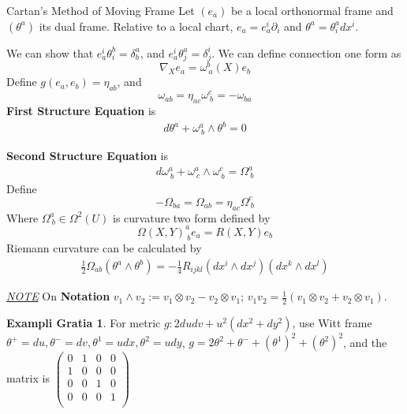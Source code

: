 \documentclass[twocolumn]{article}
\renewcommand{\emph}[1]{{\color{blue!70!black}\sffamily\bfseries #1}}
\newcommand{\n}{\nabla}
\newcommand{\p}{\partial}
\newcommand{\N}{\textit{\underline{NOTE} }}
\newcommand{\W}{\Omega}
\theoremstyle{definition}
\newtheorem{example}[thm]{Exampli Gratia}
\begin{document}
\begin{fthm}{Cartan's Method of Moving Frame}{}
	Let $(e_a)$ be a local orthonormal frame and $(\theta ^a)$ its dual frame.
	Relative to a local chart, $e_a = e^i_a \p_i$ and $\theta^a = \theta^a_i dx^i$.

	We can show that $e^i_a \theta^b_i = \delta^a_b$, and $e^i_a \theta^a_j = \delta^i_j$.
	We can define connection one form as 
	$$
	\n_X e_a= \omega^b_{\ a}(X) e_b
	$$
	Define $g(e_a, e_b) = \eta_{ab}$, and 
	$$
	\omega_{ab} = \eta_{ac} \omega^c_{\ b} = - \omega_{ba}
	$$
	\emph{First Structure Equation} is
	\begin{align}
		d \theta^a + \omega^a_{\ b} \wedge \theta^b = 0
	\end{align}

	\emph{Second Structure Equation} is
	\begin{align}
		d \omega^a_{\ b} + \omega^a_{\ c} \wedge \omega^c_{\ b} = \Omega^a_{\ b}
	\end{align}
	Define 
	$$
		- \W_{ba} = \W_{ab} = \eta_{ac}\W^c_{\ b} 
	$$
	Where $\W^a_{\ b} \in \W^2(U)$ is curvature two form defined by 
	$$
		\W(X,Y)^a_{\ b} e_a = R(X, Y) e_b
	$$
	Riemann curvature can be calculated by 
	\begin{align}
		\frac{1}{2} \W_{ab}(\theta^a \wedge \theta^b) = - \frac{1}{4} R_{ijkl}(dx^i \wedge dx^j)(dx^k \wedge dx^l)
	\end{align}
\end{fthm}

\N On \emph{Notation}
$v_1 \wedge v_2 := v_1 \otimes v_2 - v_2 \otimes v_1$; $v_1v_2 = \frac{1}{2}(v_1\otimes v_2 + v_2\otimes v_1)$.

\begin{example}
	For metric $g: 2dudv + u^2(dx^2 + dy^2)$, use Witt frame $\theta^+ = du, \theta^- = dv, \theta^1 = udx, \theta^2 = udy$, $g = 2 \theta^2+\theta^{-} + (\theta^1)^2 + (\theta^2)^2$, and the matrix is 
	$ 
	\begin{pmatrix}
		0 & 1 & 0 & 0 \\
		1 & 0 & 0 & 0 \\
		0 & 0 & 1 & 0 \\
		0 & 0 & 0 & 1 \\
	\end{pmatrix}
	$
\end{example}
\end{document}
